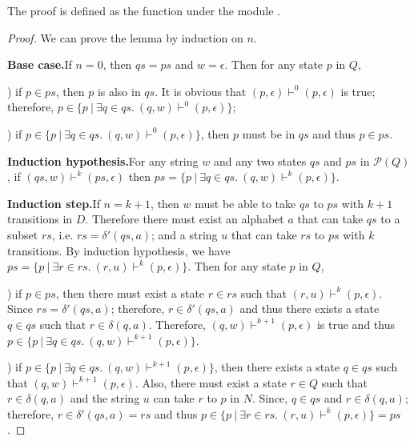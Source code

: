 \par The proof is defined as the function  under the module
. 

\begin{proof}
\noindent We can prove the lemma by induction on \(n\). 

\par \noindent \textbf{Base case.}\quad If \(n = 0\), then \(qs = ps\)
and \(w = \epsilon\). Then for any state \(p\) in \(Q\), 
\par {}) if \(p \in ps\), then \(p\) is also in \(qs\). It is obvious that
\((p,\epsilon) \vdash^0 (p, \epsilon)\) is true; therefore, \(p \in
\{p\ |\ \exists q\in qs.\ (q,w) \vdash^0 (p,\epsilon)\}\); 
\par {}) if \(p \in \{p\ |\ \exists q\in qs.\ (q,w) \vdash^0
(p,\epsilon)\}\), then \(p\) must be in \(qs\) and thus \(p \in ps\). 

\par \noindent \textbf{Induction hypothesis.}\quad For any string \(w\) and any
two states \(qs\) and \(ps\) in \(\mathcal P \left({Q}\right)\), if
\((qs,w) \vdash^k (ps,\epsilon)\) then \(ps =
\{p\ |\ \exists q\in qs.\ (q,w) \vdash^k (p,\epsilon)\}\). 

\par \noindent \textbf{Induction step.}\quad If \(n = k + 1\), then
\(w\) must be able to take \(qs\) to \(ps\) with \(k + 1\)
transitions in \(D\). Therefore there must exist an alphabet \(a\)
that can take \(qs\) to a subset \(rs\),
i.e. \(rs = \delta'(qs,a)\); and a string \(u\) that can take \(rs\) to
\(ps\) with \(k\) transitions. By induction hypothesis, we have \(ps =
\{p\ |\ \exists r\in rs.\ (r,u) \vdash^k (p,\epsilon)\}\). Then for any state \(p\) in \(Q\), 

\par {}) if \(p \in ps\), then there must exist a state \(r \in rs\)
such that \((r,u) \vdash^k (p,\epsilon)\). Since \(rs =
\delta'(qs,a)\); therefore, \(r \in \delta'(qs,a)\) and thus there
exists a state \(q \in qs\) such that \(r \in \delta (q,a)\). Therefore,
\((q,w) \vdash^{k+1} (p,\epsilon)\) is true and thus \(p \in \{p\ |\ \exists q\in qs.\ (q,w) \vdash^{k+1}
(p,\epsilon)\}\). 

\par {}) if \(p \in \{p\ |\ \exists q\in qs.\ (q,w) \vdash^{k+1}
(p,\epsilon)\}\), then there exists a state \(q \in qs\) such that \((q,w) \vdash^{k+1}
(p,\epsilon)\). Also, there must exist a state \(r \in Q\) such that
\(r \in \delta (q,a)\) and the string \(u\) can take \(r\) to \(p\) in
\(N\). Since, \(q
\in qs\) and \(r \in \delta (q,a)\); therefore, \(r \in \delta'(qs,a)
= rs\) and thus \(p \in \{p\ |\ \exists r\in rs.\ (r,u) \vdash^k
(p,\epsilon)\} = ps\). 
\end{proof}

